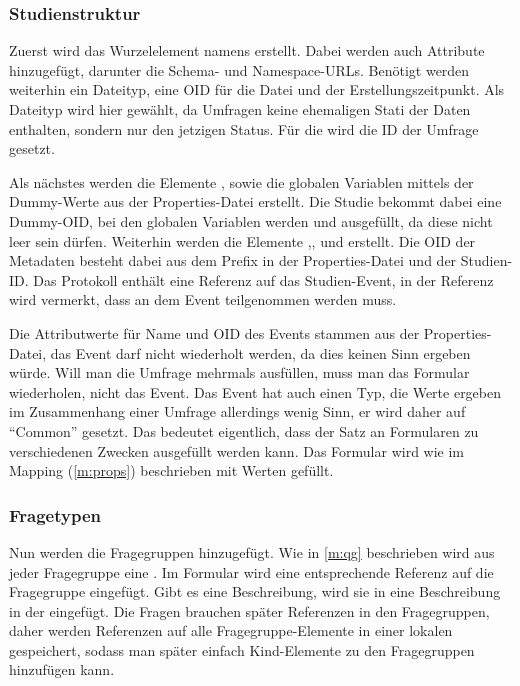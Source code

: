 \subsubsection{Studienstruktur}

Zuerst wird das Wurzelelement namens  erstellt.
Dabei werden auch Attribute hinzugefügt, darunter die Schema- und Namespace-URLs. Benötigt werden weiterhin ein Dateityp, eine OID für die Datei und der Erstellungszeitpunkt.
Als Dateityp wird hier  gewählt, da Umfragen keine ehemaligen Stati der Daten enthalten, sondern nur den jetzigen Status.
Für die  wird die ID der Umfrage gesetzt.

Als nächstes werden die Elemente , sowie die globalen Variablen mittels der Dummy-Werte aus der Properties-Datei erstellt.
Die Studie bekommt dabei eine Dummy-OID, bei den globalen Variablen werden  und  ausgefüllt, da diese nicht leer sein dürfen.
Weiterhin werden die Elemente ,,  und  erstellt.
Die OID der Metadaten besteht dabei aus dem Prefix in der Properties-Datei und der Studien-ID.
Das Protokoll enthält eine Referenz auf das Studien-Event, in der Referenz wird vermerkt, dass an dem Event teilgenommen werden muss.

Die Attributwerte für Name und OID des Events stammen aus der Properties-Datei, das Event darf nicht wiederholt werden, da dies keinen Sinn ergeben würde.
Will man die Umfrage mehrmals ausfüllen, muss man das Formular wiederholen, nicht das Event.
Das Event hat auch einen Typ, die Werte ergeben im Zusammenhang einer Umfrage allerdings wenig Sinn, er wird daher auf \enquote{Common} gesetzt. Das bedeutet eigentlich, dass der Satz an Formularen zu verschiedenen Zwecken ausgefüllt werden kann.
Das Formular wird wie im Mapping (\cref{m:props}) beschrieben mit Werten gefüllt.

\subsubsection{Fragetypen}

Nun werden die Fragegruppen hinzugefügt. Wie in \cref{m:qg} beschrieben wird aus jeder Fragegruppe eine .
Im Formular wird eine entsprechende Referenz auf die Fragegruppe eingefügt.
Gibt es eine Beschreibung, wird sie in eine Beschreibung in der  eingefügt.
Die Fragen brauchen später Referenzen in den Fragegruppen, daher werden Referenzen auf alle Fragegruppe-Elemente in einer lokalen  gespeichert, sodass man später einfach Kind-Elemente zu den Fragegruppen hinzufügen kann.

